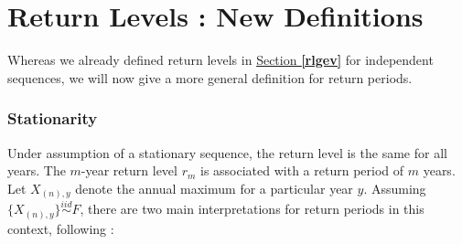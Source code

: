 \section{Return Levels : New Definitions}\label{sec:returnlvlnstatio}

Whereas we already defined return levels in \hyperref[rlgev]{Section  \textbf{\ref{rlgev}}} for independent sequences, we will now give a more general definition for return periods. 

\subsubsection*{ Stationarity} 
Under assumption of a
stationary sequence, the return level is the same for all years. The $m$-year return level $r_m$ is associated with a return period of $m$ years. Let $X_{(n),y}$ denote the annual maximum for a particular year $y$. Assuming $\{X_{(n),y}\}\stackrel{iid}{\sim}F$, there are two main interpretations for return periods in this context, following \citet[chap.4]{ag_extremes_2013} :

